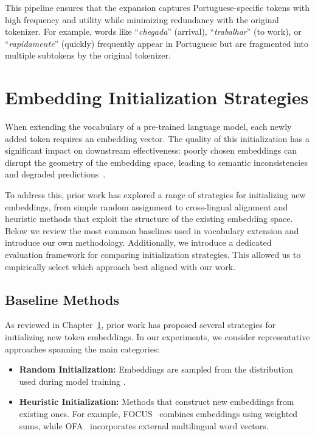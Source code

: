 This pipeline ensures that the expansion captures Portuguese-specific tokens with high frequency and utility while minimizing redundancy with the original tokenizer. For example, words like ``\textit{chegada}'' (arrival), ``\textit{trabalhar}'' (to work), or ``\textit{rapidamente}'' (quickly) frequently appear in Portuguese but are fragmented into multiple subtokens by the original tokenizer.


\section{Embedding Initialization Strategies}
\label{sec:embedding_init}

When extending the vocabulary of a pre-trained language model, each newly added token requires an embedding vector. The quality of this initialization has a significant impact on downstream effectiveness: poorly chosen embeddings can disrupt the geometry of the embedding space, leading to semantic inconsistencies and degraded predictions~\cite{artetxe2018robust, chronopoulou2020reusing}.

To address this, prior work has explored a range of strategies for initializing new embeddings, from simple random assignment to cross-lingual alignment and heuristic methods that exploit the structure of the existing embedding space. Below we review the most common baselines used in vocabulary extension and introduce our own methodology. Additionally, we introduce a dedicated evaluation framework for comparing initialization strategies. This allowed us to empirically select which approach best aligned with our work.



\subsection{Baseline Methods}
As reviewed in Chapter~\ref{sec:embedding_init}, prior work has proposed several strategies for initializing new token embeddings. In our experiments, we consider representative approaches spanning the main categories:

\begin{itemize}
    \item \textbf{Random Initialization:} Embeddings are sampled from the distribution used during model training \cite{kocmi2017exploration}.
    \item \textbf{Heuristic Initialization:} Methods that construct new embeddings from existing ones. For example, FOCUS~\cite{dobler2023focus} combines embeddings using weighted sums, while OFA~\cite{liu2023ofa} incorporates external multilingual word vectors.
\end{itemize}

